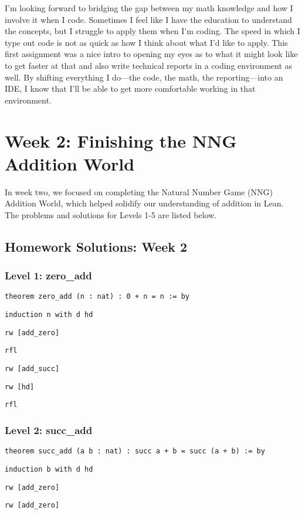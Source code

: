 \documentclass{article}
\begin{document}
I'm looking forward to bridging the gap between my math knowledge and how I involve it when I code. Sometimes I feel like I have the education to understand the concepts, but I struggle to apply them when I'm coding. The speed in which I type out code is not as quick as how I think about what I'd like to apply. This first assignment was a nice intro to opening my eyes as to what it might look like to get faster at that and also write technical reports in a coding environment as well. By shifting everything I do—the code, the math, the reporting—into an IDE, I know that I'll be able to get more comfortable working in that environment.

\section{Week 2: Finishing the NNG Addition World}
\label{sec:week2}

In week two, we focused on completing the Natural Number Game (NNG) Addition World, which helped solidify our understanding of addition in Lean. The problems and solutions for Levels 1-5 are listed below.

\subsection*{Homework Solutions: Week 2}

\subsubsection*{Level 1: zero\_add}
\texttt{theorem zero\_add (n : nat) : 0 + n = n := by}

\texttt{induction n with d hd}

\texttt{rw [add\_zero]}

\texttt{rfl}

\texttt{rw [add\_succ]}

\texttt{rw [hd]}

\texttt{rfl}

\subsubsection*{Level 2: succ\_add}
\texttt{theorem succ\_add (a b : nat) : succ a + b = succ (a + b) := by}

\texttt{induction b with d hd}

\texttt{rw [add\_zero]}

\texttt{rw [add\_zero]}
\end{document}
